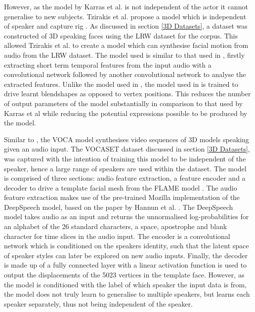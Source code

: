 However, as the model by Karras et al. is not independent of the actor it cannot generalise to new subjects.
Tzirakis et al. propose a model which is independent of speaker and capture rig \cite{Tzirakis2019}.
As discussed in section \ref{3D Datasets}, a dataset was constructed of 3D speaking faces using the LRW dataset \cite{Chung2016} for the corpus.
This allowed Tzirakis et al. to create a model which can synthesise facial motion from audio from the LRW dataset.
The model used is similar to that used in \cite{Karras2017a}, firstly extracting short term temporal features from the input audio with a convolutional network followed by another convolutional network to analyse the extracted features.
Unlike the model used in \cite{Karras2017a}, the model used in \cite{Tzirakis2019} is trained to drive learnt blendshapes as opposed to vertex positions.
This reduces the number of output parameters of the model substantially in comparison to that used by Karras et al while reducing the potential expressions possible to be produced by the model.

Similar to \cite{Tzirakis2019}, the VOCA model \cite{Cudeiro2019} synthesises video sequences of 3D models speaking given an audio input.
The VOCASET dataset discussed in section \ref{3D Datasets}, was captured with the intention of training this model to be independent of the speaker, hence a large range of speakers are used within the dataset.
The model is comprised of three sections: audio feature extraction, a feature encoder and a decoder to drive a template facial mesh from the FLAME model \cite{Li2017}.
The audio feature extraction makes use of the pre-trained Mozilla implementation of the DeepSpeech model, based on the paper by Hannun et al. \cite{Hannun2014}.
The DeepSpeech model takes audio as an input and returns the unnormalised log-probabilities for an alphabet of the 26 standard characters, a space, apostrophe and blank character for time slices in the audio input.
The encoder is a convolutional network which is conditioned on the speakers identity, such that the latent space of speaker styles can later be explored on new audio inputs.
Finally, the decoder is made up of a fully connected layer with a linear activation function is used to output the displacements of the 5023 vertices in the template face.
However, as the model is conditioned with the label of which speaker the input data is from, the model does not truly learn to generalise to multiple speakers, but learns each speaker separately, thus not being independent of the speaker.

